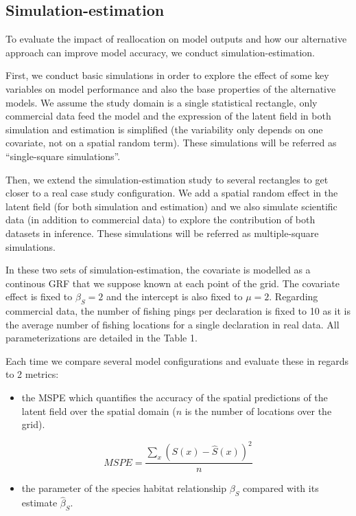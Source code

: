 \documentclass[
  english,
  man,floatsintext]{apa6}
\providecommand{\tightlist}{%
  \setlength{\itemsep}{0pt}\setlength{\parskip}{0pt}}
\begin{document}
\hypertarget{simulation-estimation}{%
\subsection{Simulation-estimation}\label{simulation-estimation}}

To evaluate the impact of reallocation on model outputs and how our alternative approach can improve model accuracy, we conduct simulation-estimation.

First, we conduct basic simulations in order to explore the effect of some key variables on model performance and also the base properties of the alternative models. We assume the study domain is a single statistical rectangle, only commercial data feed the model and the expression of the latent field in both simulation and estimation is simplified (the variability only depends on one covariate, not on a spatial random term). These simulations will be referred as \enquote{single-square simulations}.

Then, we extend the simulation-estimation study to several rectangles to get closer to a real case study configuration. We add a spatial random effect in the latent field (for both simulation and estimation) and we also simulate scientific data (in addition to commercial data) to explore the contribution of both datasets in inference. These simulations will be referred as multiple-square simulations.

In these two sets of simulation-estimation, the covariate is modelled as a continous GRF that we suppose known at each point of the grid. The covariate effect is fixed to \(\beta_S=2\) and the intercept is also fixed to \(\mu=2\). Regarding commercial data, the number of fishing pings per declaration is fixed to 10 as it is the average number of fishing locations for a single declaration in real data. All parameterizations are detailed in the Table 1.

Each time we compare several model configurations and evaluate these in regards to 2 metrics:

\begin{itemize}
\tightlist
\item
  the MSPE which quantifies the accuracy of the spatial predictions of the latent field over the spatial domain (\(n\) is the number of locations over the grid).
\end{itemize}

\[MSPE=\frac{\sum_x (S(x) - \hat{S}(x) ) ^2}{n}\]

\begin{itemize}
\tightlist
\item
  the parameter of the species habitat relationship \(\beta_S\) compared with its estimate \(\hat \beta_S\).
\end{itemize}
\end{document}
